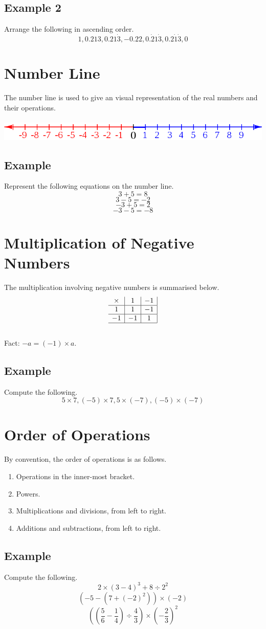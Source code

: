 \documentclass[a4paper,12pt]{article}
\begin{document}
\subsection{Example 2}
Arrange the following in ascending order.
\[1,0.213,0.21\dot3,-0.22,0.\dot21\dot3,0.2\dot1\dot3,0\]

\section{Number Line}
The number line is used to give an visual representation of the real numbers and their operations.
\\
\\
\includegraphics[width=\textwidth]{num.png}
\subsection{Example}
Represent the following equations on the number line.
\[3+5=8\]
\[3-5=-2\]
\[-3+5=2\]
\[-3-5=-8\]	

\section{Multiplication of Negative Numbers}
The multiplication involving negative numbers is summarised below.
\[\begin{array}{c|c|c|}
    \times&1&-1\\
    \hline
    1&1&-1\\
    \hline
    -1&-1&1\\
    \hline
\end{array}\]
\\
Fact: \(-a=(-1)\times a\).
\subsection{Example}
Compute the following.
\[5\times7,(-5)\times7,5\times(-7),(-5)\times(-7)\]
\section{Order of Operations}
By convention, the order of operations is as follows.
\begin{enumerate}
    \item Operations in the inner-most bracket.
    \item Powers.
    \item Multiplications and divisions, from left to right.
    \item Additions and subtractions, from left to right.
\end{enumerate}
\subsection{Example}
Compute the following.
\[2\times(3-4)^3+8\div2^2\]
\[\left(-5-\left(7+(-2)^2\right)\right)\times(-2)\]
\[\left(\left(\frac56-\frac14\right)\div\frac43\right)\times\left(-\frac23\right)^2\]
\end{document}
